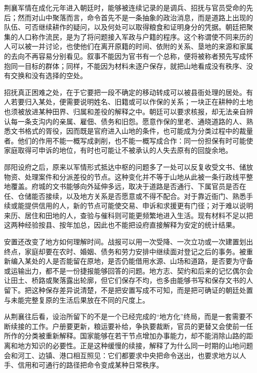 荆襄军情在成化元年进入朝廷时，能够被连续记录的是调兵、招抚与官员受命的先后；然而对山中聚落而言，命令首先不是一条抽象的政治消息，而是道路上出现的队伍、可否继续耕作的疑问，以及何处可以取得粮食和证明身分的凭据。朝廷把聚集的人口称作流民，是为了将问题接入军政与户籍的程序。这个称谓使不同来历的人可以被一并讨论，也使他们在离开原籍的时间、依附的关系、垦地的来源和家属的去向不再容易分别看见。叙事不能因为官书有一个总称，便将被称者预先写成怀抱同一目标的群体；同样，不能因为材料未逐户保存，就把山地看成没有秩序、没有交换和没有选择的空处。

招抚真正困难之处，在于它要把一段不确定的移动转成可以被县衙处理的居处。有人若要归入某处，便需要说明姓名、旧籍或可以作保的关系；一块正在耕种的土地也须被放进某种田界、归属和差役的解释之中。朝廷可以要求核报，却无法亲自辨认每一条支沟内的亲属、雇佃、债务和旧怨。愿意作保的里老、通晓道路的人、熟悉文书格式的胥役，因而既是官府进入山地的条件，也可能成为分类过程中的裁量者。他们的作用不能一概写成剥削，也不能一概写成合作：同一份担保有时可能使家庭取得可申诉的地位，有时也可能让不被承认的人失去原有的回旋余地。

郧阳设府之后，原来以军情形式抵达中枢的问题多了一处可以反复收受文书、储放物资、处理案件和分派差役的节点。这种变化并不等于山地从此被一条行政线平整地覆盖。府城的文书能够向外延伸多远，取决于道路是否通行、下属官员是否在任、仓储能否接续，以及地方关系是否愿意或不得不配合。对于靠近衙门、熟悉手续或能提供信用的人，新的节点可能使交易、申诉和求援更有门径；对于难以说明来历、居住和田地的人，查验与催科则可能更频繁地进入生活。现有材料不足以把这两种经验按县、按年加总，因此也不能把设府直接解释为安定的统计结果。

安置还改变了地方如何理解时间。战报可以用一次受降、一次立功或一次建置划出终点，家庭却要在农时、婚姻、债务和劳力安排中继续面对登记之后的事务。被重新编入某处的人是否能留在原地，是否仍能借用水源、山场和道路，是否要为守备或运输出力，都不是一份捷报能够回答的问题。地方志、契约和后来的记忆偶尔会让田土、桥路或聚落露出轮廓，但它们保存不均，也多由能够书写和保存文书的人留下。把这种保存差异说清楚，不是把安置写成不可知，而是把可确证的朝廷处置与未能完整复原的生活后果放在不同的尺度上。

从荆襄往后看，设治所留下的不是一个已经完成的“地方化”终局，而是一套需要不断续接的工作。户册要更新，粮运要补给，争执要裁断，官员的更替又会使前一任所作的分类被重新解释。国家能够在若干节点增加办事能力，却不能消除山路的距离和地方知识的必要性。正是这种缓慢的续接，解释了为什么同一时期的山地问题会和河工、边镇、港口相互照见：它们都要求中央把命令送出，也要求地方以人手、信用和可通行的路径把命令变成某种日常秩序。


